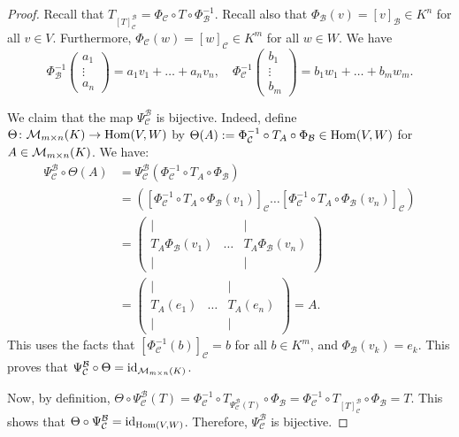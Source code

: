 \begin{proof}
  Recall that $T_{[T]_{\mathcal{C}}^{\mathcal{B}}} = \Phi_{\mathcal{C}} \circ T \circ \Phi_{\mathcal{B}}^{-1}$. Recall also that $\Phi_{\mathcal{B}}(v) = [v]_{\mathcal{B}} \in K^n$ for all $v \in V$. Furthermore, $\Phi_{\mathcal{C}}(w) = [w]_{\mathcal{C}} \in K^m$ for all $w \in W$. We have
  \[ \Phi_{\mathcal{B}}^{-1} \begin{pmatrix} a_1 \\ \vdots \\ a_n \end{pmatrix} = a_1 v_1 + \dots + a_n v_n, \quad \Phi_{\mathcal{C}}^{-1} \begin{pmatrix} b_1 \\ \vdots \\ b_m \end{pmatrix} = b_1 w_1 + \dots + b_m w_m. \]

  We claim that the map $\Psi_{\mathcal{C}}^{\mathcal{B}}$ is bijective. Indeed, define $\Theta \colon \mathcal{M}_{m \times n}(K) \to \operatorname{Hom}(V,W)$ by $\Theta(A) := \Phi_{\mathcal{C}}^{-1} \circ T_A \circ \Phi_{\mathcal{B}} \in \operatorname{Hom}(V,W)$ for $A \in \mathcal{M}_{m \times n}(K)$. We have:
  \begin{align*}
    \Psi_{\mathcal{C}}^{\mathcal{B}} \circ \Theta(A) &= \Psi_{\mathcal{C}}^{\mathcal{B}}(\Phi_{\mathcal{C}}^{-1} \circ T_A \circ \Phi_{\mathcal{B}}) \\
    &= \left( [\Phi_{\mathcal{C}}^{-1} \circ T_A \circ \Phi_{\mathcal{B}}(v_1)]_{\mathcal{C}} \dots [\Phi_{\mathcal{C}}^{-1} \circ T_A \circ \Phi_{\mathcal{B}}(v_n)]_{\mathcal{C}} \right) \\
    &= \begin{pmatrix} | & & | \\ T_A \Phi_{\mathcal{B}}(v_1) & \dots & T_A \Phi_{\mathcal{B}}(v_n) \\ | & & | \end{pmatrix} \\
    &= \begin{pmatrix} | & & | \\ T_A(e_1) & \dots & T_A(e_n) \\ | & & | \end{pmatrix} = A.
  \end{align*}
  This uses the facts that $[\Phi_{\mathcal{C}}^{-1}(b)]_{\mathcal{C}} = b$ for all $b \in K^m$, and $\Phi_{\mathcal{B}}(v_k) = e_k$. This proves that $\Psi_{\mathcal{C}}^{\mathcal{B}} \circ \Theta = \operatorname{id}_{\mathcal{M}_{m \times n}(K)}$.

  Now, by definition, $\Theta \circ \Psi_{\mathcal{C}}^{\mathcal{B}}(T) = \Phi_{\mathcal{C}}^{-1} \circ T_{\Psi_{\mathcal{C}}^{\mathcal{B}}(T)} \circ \Phi_{\mathcal{B}} = \Phi_{\mathcal{C}}^{-1} \circ T_{[T]_{\mathcal{C}}^{\mathcal{B}}} \circ \Phi_{\mathcal{B}} = T$. This shows that $\Theta \circ \Psi_{\mathcal{C}}^{\mathcal{B}} = \operatorname{id}_{\operatorname{Hom}(V,W)}$. Therefore, $\Psi_{\mathcal{C}}^{\mathcal{B}}$ is bijective.


\end{proof}

